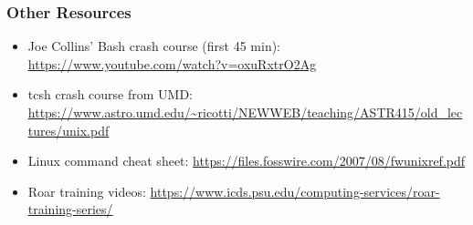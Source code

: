 \documentclass[hyperref,pdfa,unicode,utf8,usepdftitle]{beamer}
\begin{document}
\begin{frame}
  \frametitle{Other Resources}
  \begin{itemize}
  \item Joe Collins’ Bash crash course (first 45
    min): \url{https://www.youtube.com/watch?v=oxuRxtrO2Ag}
  \item tcsh crash course from
    UMD:
    \url{https://www.astro.umd.edu/~ricotti/NEWWEB/teaching/ASTR415/old_lectures/unix.pdf}
  \item Linux command cheat
    sheet: \url{https://files.fosswire.com/2007/08/fwunixref.pdf}
  \item Roar training
    videos:
    \url{https://www.icds.psu.edu/computing-services/roar-training-series/}
  \end{itemize}
\end{frame}
\end{document}
